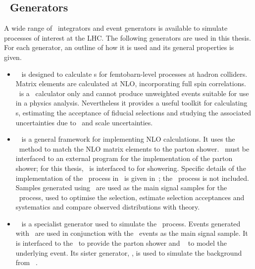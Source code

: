 \subsection{\mc\ Generators}
\label{sec:Theory-MC-gen}

A wide range of \mc\ integrators and event generators is available to simulate
processes of interest at the LHC. The
following generators are used in this thesis. For each generator, an outline of
how it is used and its general properties is given.

\begin{itemize}
    \item \mcfm ~\cite{Campbell:2011} is designed to calculate \cx s for
    femtobarn-level processes at hadron colliders. Matrix elements are
    calculated at NLO, incorporating full spin correlations. \mcfm\ is a \cx\
    calculator only and cannot produce unweighted events suitable for use in a
    physics analysis. Nevertheless it provides a useful toolkit for calculating
    \cx s, estimating the acceptance of fiducial selections and studying the
    associated uncertainties due to \partDF\ and scale uncertainties.

    \item \powhegbox~\cite{Alioli:2010xd} is a general framework for implementing
    NLO calculations. It uses the \powheg\ method to match the NLO matrix
    elements to the parton shower. \powhegbox\ must be interfaced to an external
    program for the implementation of the parton shower; for this thesis,
    \powhegbox\ is interfaced to \pythia for showering. Specific details of the
    implementation of the \ZZ\ process in \powhegbox\ is given
    in~\cite{Melia:2011tj}; the \ggZZ\ process is not included. 
    Samples generated using \powhegbox\ are used as the main signal samples for
    the \qqZZ\ process, used to optimise the selection, estimate selection
    acceptances and systematics and compare observed distributions with theory.

    \item \ggtwoZZ~\cite{gg2ZZ} is a specialist generator used to simulate the
    \ggZZ\ process. Events generated with \ggtwoZZ\ are used in conjunction with
    the \powhegbox\ events as the main signal sample. It is interfaced to the
    \herwig\ to provide the parton shower and \jimmy~\cite{bib:jimmy} to model the underlying
    event. Its sister generator, \ggtwoWW, is used to simulate the background
    from \ggWW~\cite{Binoth:2006mf}.


\end{itemize}
